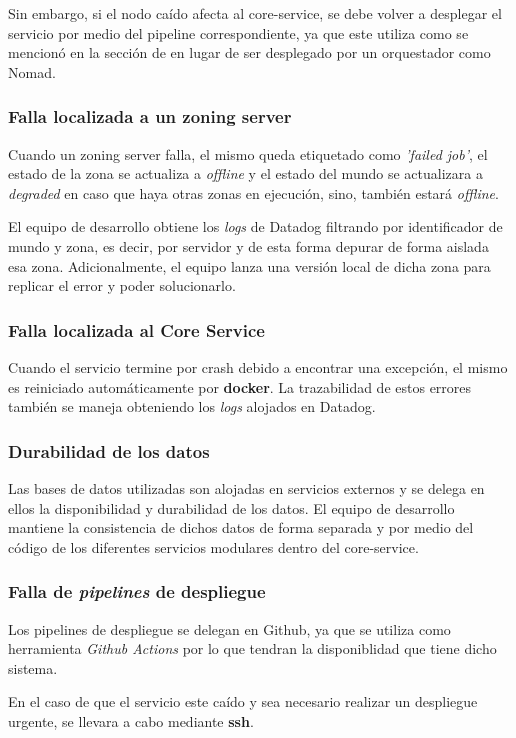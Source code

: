Sin embargo, si el nodo caído afecta al core-service, se debe volver a desplegar el servicio por medio del pipeline correspondiente, ya que este utiliza
 como se mencionó en la sección de  en lugar de ser desplegado por un orquestador como Nomad.

\subsubsection{Falla localizada a un zoning server}

Cuando un zoning server falla, el mismo queda etiquetado como \textit{'failed job'}, el estado de la zona se actualiza a \textit{offline} y
el estado del mundo se actualizara a \textit{degraded} en caso que haya otras zonas en ejecución, sino, también estará \textit{offline}.

El equipo de desarrollo obtiene los \textit{logs} de Datadog filtrando por identificador de mundo y zona, es decir, por servidor y de esta
forma depurar de forma aislada esa zona.
Adicionalmente, el equipo lanza una versión local de dicha zona para replicar el error y poder solucionarlo.

\subsubsection{Falla localizada al Core Service}

Cuando el servicio termine por crash debido a encontrar una excepción, el mismo es reiniciado automáticamente por \textbf{docker}. La trazabilidad de estos errores también
se maneja obteniendo los \textit{logs} alojados en Datadog.

\subsubsection{Durabilidad de los datos}

Las bases de datos utilizadas son alojadas en servicios externos y se delega en ellos la disponibilidad y durabilidad de los datos.
El equipo de desarrollo mantiene la consistencia de dichos datos de forma separada y por medio del código de los diferentes servicios modulares dentro del core-service.

\subsubsection{Falla de \textit{pipelines} de despliegue}

Los pipelines de despliegue se delegan en Github, ya que se utiliza como herramienta \textit{Github Actions} por lo que tendran la disponiblidad que tiene dicho sistema.

En el caso de que el servicio este caído y sea necesario realizar un despliegue urgente, se llevara a cabo mediante \textbf{ssh}.
